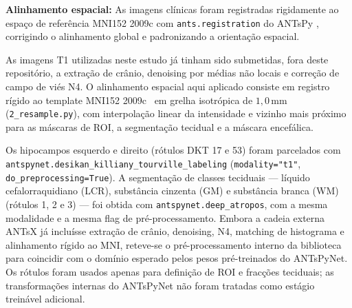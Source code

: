 \documentclass[review]{elsarticle}
\newcommand{\code}[1]{\texttt{#1}}
\begin{document}
		
	\textbf{Alinhamento espacial:} As imagens clínicas foram registradas rigidamente ao espaço de referência MNI152 2009c \cite{fonov-2009,fonov-2011} com \code{ants.registration} do ANTsPy \cite{avants-2011a,tustison-2021}, corrigindo o alinhamento global e padronizando a orientação espacial.
	
	As imagens T1 utilizadas neste estudo já tinham sido submetidas, fora deste repositório, a extração de crânio, denoising por médias não locais e correção de campo de viés N4.
	O alinhamento espacial aqui aplicado consiste em registro rígido ao template MNI152 2009c~\cite{fonov-2011} em grelha isotrópica de $1{,}0$\,mm (\code{2\_resample.py}), com interpolação linear da intensidade e vizinho mais próximo para as máscaras de ROI, a segmentação tecidual e a máscara encefálica.
	
	
	Os hipocampos esquerdo e direito (rótulos DKT 17 e 53) foram parcelados com \code{antspynet.desikan\_killiany\_tourville\_labeling} (\code{modality="t1"}, \code{do\_preprocessing=True}). A segmentação de classes teciduais --- líquido cefalorraquidiano (LCR), substância cinzenta (GM) e substância branca (WM) (rótulos 1, 2 e 3) --- foi obtida com \code{antspynet.deep\_atropos}, com a mesma modalidade e a mesma flag de pré-processamento.
	Embora a cadeia externa ANTsX já incluísse extração de crânio, denoising, N4, matching de histograma e alinhamento rígido ao MNI, reteve-se o pré-processamento interno da biblioteca para coincidir com o domínio esperado pelos pesos pré-treinados do ANTsPyNet. Os rótulos foram usados apenas para definição de ROI e fracções teciduais; as transformações internas do ANTsPyNet não foram tratadas como estágio treinável adicional.
	
\end{document}
